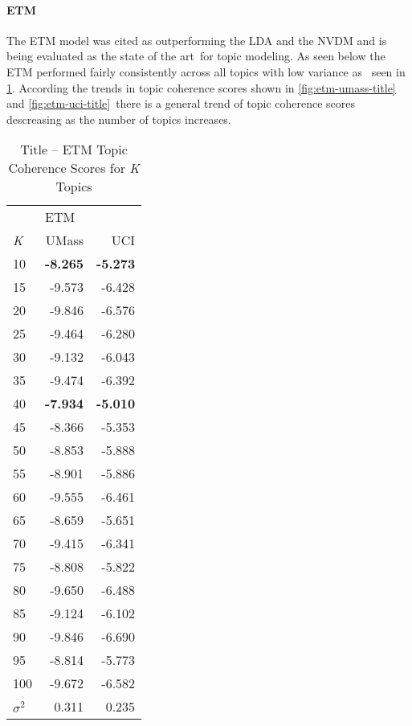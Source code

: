 \documentclass[letterpaper,12pt]{article}
\begin{document}
\paragraph{ETM}
The ETM model was cited as outperforming the LDA and the NVDM and is being evaluated as the state of the art\
for topic modeling. As seen below the ETM performed fairly consistently across all topics with low variance as \
seen in \ref{tab:etm_title_tc}. According the trends in topic coherence scores shown in \ref{fig:etm-umass-title} and \ref{fig:etm-uci-title}\
there is a general trend of topic coherence scores descreasing as the number of topics increases.
\begin{table}
	\caption{\label{tab:etm_title_tc} Title -- ETM Topic Coherence Scores for \emph{K} Topics}
	\begin{center}
		\begin{tabular}{lrr}
			\toprule
			{} & \multicolumn{2}{l}{ETM} \\
			\emph{K} &  UMass &    UCI \\
			\midrule
			10  & \textbf{-8.265} & \textbf{-5.273} \\
			15  & -9.573 & -6.428 \\
			20  & -9.846 & -6.576 \\
			25  & -9.464 & -6.280 \\
			30  & -9.132 & -6.043 \\
			35  & -9.474 & -6.392 \\
			40  & \textbf{-7.934} & \textbf{-5.010} \\
			45  & -8.366 & -5.353 \\
			50  & -8.853 & -5.888 \\
			55  & -8.901 & -5.886 \\
			60  & -9.555 & -6.461 \\
			65  & -8.659 & -5.651 \\
			70  & -9.415 & -6.341 \\
			75  & -8.808 & -5.822 \\
			80  & -9.650 & -6.488 \\
			85  & -9.124 & -6.102 \\
			90  & -9.846 & -6.690 \\
			95  & -8.814 & -5.773 \\
			100 & -9.672 & -6.582 \\
			\midrule
			$\sigma^2$ & 0.311 & 0.235 \\
			\bottomrule
			\end{tabular}
	\end{center}
\end{table}
\end{document}
